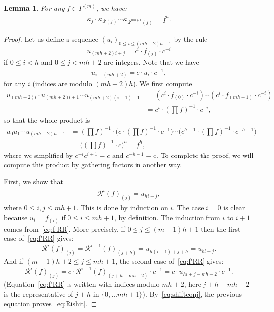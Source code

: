 \documentclass[11pt]{article}
\newtheorem{lemm}[theo]{Lemma}
\theoremstyle{definition}
\newcommand{\RR}{\mathcal{R}}
\begin{document}
\begin{lemm}
    For any $f\in\Gamma^{(m)}$, we have:
    \begin{align}
        \kappa_{f} \cdot \kappa_{\RR(f)} \cdots \kappa_{\RR^{mh+1}(f)}
        = \underline{f}^h.
    \end{align}
\end{lemm}

\begin{proof}
    Let us define a sequence $(u_i)_{0\leq i \leq (mh+2)h-1}$ by the rule
    \[
        u_{(mh+2)i+j} = c^i \cdot f_{(j)} \cdot c^{-i}
    \]
    if $0 \leq i < h$ and $0 \leq j < mh+2$ are integers.  Note that we have
    \begin{align} \label{eq:shiftconj}
        u_{i+(mh+2)} = c \cdot u_{i} \cdot c^{-1},
    \end{align}
    for any $i$ (indices are modulo $(mh+2)h$).  We first compute
    \begin{align*}
        u_{(mh+2)i} \cdot u_{(mh+2)i+1} \cdots u_{(mh+2)(i+1)-1}
        &= (c^i \cdot f_{(0)} \cdot c^{-i}) \cdots (c^i \cdot f_{(mh+1)} \cdot c^{-i}) \\
        &= c^i \cdot (\prod f)^{-1} \cdot c^{-i},
    \end{align*}
    so that the whole product is
    \begin{align}
        u_0 u_1 \cdots u_{(mh+2)h-1} 
        &= 
        (\prod f)^{-1} \cdot 
        \Big( c \cdot (\prod f)^{-1} \cdot c^{-1} \Big) \cdots 
        \Big( c^{h-1} \cdot (\prod f)^{-1} \cdot c^{-h+1} \Big)\\
        \label{eq:wholeproduct1}
        &=
        \Big((\prod f)^{-1} \cdot c \Big)^h = \underline{f}^h,
    \end{align}
    where we simplified by $c^{-i}c^{i+1} = c$ and $c^{-h+1} = c$.  To complete the proof, we will compute this product by gathering factors in another way.
    
    First, we show that 
    \begin{align} \label{eq:Rishit}
        \RR^i(f)_{(j)} = u_{hi+j},
    \end{align}
    where $0\leq i,j \leq mh+1$.  This is done by induction on $i$.  The case $i=0$ is clear because $u_i = f_{(i)}$ if $0\leq i \leq mh+1$, by definition.  The induction from $i$ to $i+1$ comes from~\eqref{eq:f'RR}.  More precisely, if $0\leq j \leq (m-1)h+1$ then the first case of~\eqref{eq:f'RR} gives:
    \[
        \RR^i(f)_{(j)} = \RR^{i-1}(f)_{(j+h)} = u_{h(i-1)+j+h} = u_{hi+j}.
    \]
    And if $(m-1)h+2 \leq j \leq mh+1$, the second case of~\eqref{eq:f'RR} gives:
    \[
        \RR^i(f)_{(j)} = c \cdot \RR^{i-1}(f)_{(j+h-mh-2)} \cdot c^{-1} = c\cdot u_{hi+j-mh-2} \cdot c^{-1}.
    \]
    (Equation~\eqref{eq:f'RR} is written with indices modulo $mh+2$, here $j+h-mh-2$ is the representative of $j+h$ in $\{0,\dots mh+1\}$). By~\eqref{eq:shiftconj}, the previous equation proves~\eqref{eq:Rishit}.  
    

\end{proof}
\end{document}

